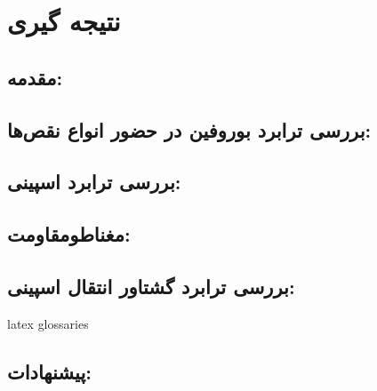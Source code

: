 \chapter{نتیجه گیری}

\clearpage
\section{مقدمه:}
\section{بررسی ترابرد بوروفین در حضور انواع نقص‌ها:}

\section{بررسی ترابرد اسپینی:}

\section{مغناطومقاومت:}

\section{بررسی ترابرد گشتاور انتقال اسپینی:}

\gls{latex}
\gls{glossaries}

\section{پیشنهادات:}
